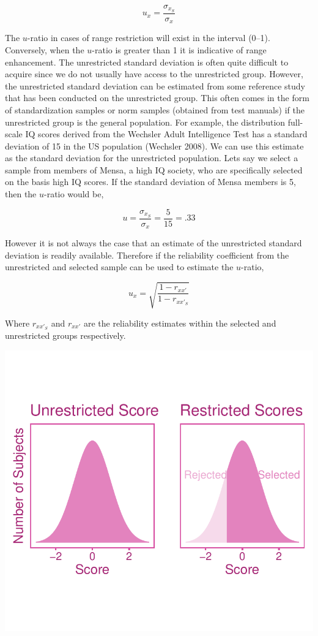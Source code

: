\documentclass[
  letterpaper,
  DIV=11,
  numbers=noendperiod]{scrreprt}
\begin{document}
\[
u_x = \frac{\sigma_{x_S}}{\sigma_x}
\]

The \(u\)-ratio in cases of range restriction will exist in the interval
(0--1). Conversely, when the \(u\)-ratio is greater than 1 it is
indicative of range enhancement. The unrestricted standard deviation is
often quite difficult to acquire since we do not usually have access to
the unrestricted group. However, the unrestricted standard deviation can
be estimated from some reference study that has been conducted on the
unrestricted group. This often comes in the form of standardization
samples or norm samples (obtained from test manuals) if the unrestricted
group is the general population. For example, the distribution
full-scale IQ scores derived from the Wechsler Adult Intelligence Test
has a standard deviation of 15 in the US population (Wechsler 2008). We
can use this estimate as the standard deviation for the unrestricted
population. Lets say we select a sample from members of Mensa, a high IQ
society, who are specifically selected on the basis high IQ scores. If
the standard deviation of Mensa members is 5, then the \(u\)-ratio would
be,

\[
u =  \frac{\sigma_{x_S}}{\sigma_x} = \frac{5}{15}= .33
\]

However it is not always the case that an estimate of the unrestricted
standard deviation is readily available. Therefore if the reliability
coefficient from the unrestricted and selected sample can be used to
estimate the \(u\)-ratio,

\[
u_x = \sqrt{\frac{1-r_{xx'}}{1-r_{xx'_S}}}
\]

Where \(r_{xx'_S}\) and \(r_{xx'}\) are the reliability estimates within
the selected and unrestricted groups respectively.

\includegraphics{direct_range_restriction_files/figure-pdf/unnamed-chunk-1-1.pdf}
\end{document}
